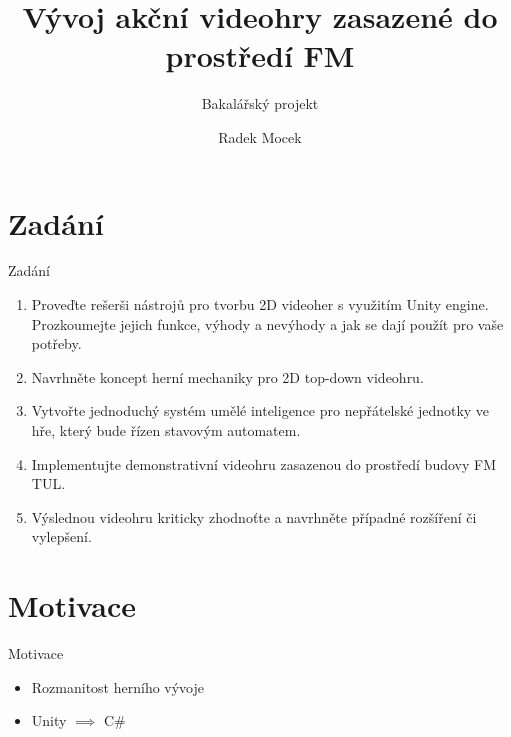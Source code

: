 \documentclass[10pt]{beamer}
\title{Vývoj akční videohry zasazené do prostředí FM}
\subtitle{Bakalářský projekt}
\author{Radek Mocek}
\date{}
\begin{document}
	
	{
	\frame[noframenumbering]{\titlepage} %
	}
	

	\section{Zadání} %
	\begin{frame}{Zadání} %
		\begin{enumerate} \setlength\itemsep{10pt} %
			\item Proveďte rešerši nástrojů pro tvorbu 2D videoher s využitím Unity engine. Prozkoumejte jejich funkce, výhody a nevýhody a jak se dají použít pro vaše potřeby.
			\item Navrhněte koncept herní mechaniky pro 2D top-down videohru.
			\item Vytvořte jednoduchý systém umělé inteligence pro nepřátelské jednotky ve hře,	který bude řízen stavovým automatem.
			\item Implementujte demonstrativní videohru zasazenou do prostředí budovy FM TUL.
			\item Výslednou videohru kriticky zhodnoťte a navrhněte případné rozšíření či vylepšení.
		\end{enumerate}
	\end{frame}

	\section{Motivace}
	\begin{frame}{Motivace}
		\begin{itemize}\setlength\itemsep{10pt} %
			\item Rozmanitost herního vývoje
			\item Unity $\implies$ C\#
		\end{itemize}
	\end{frame}
	
\end{document}
